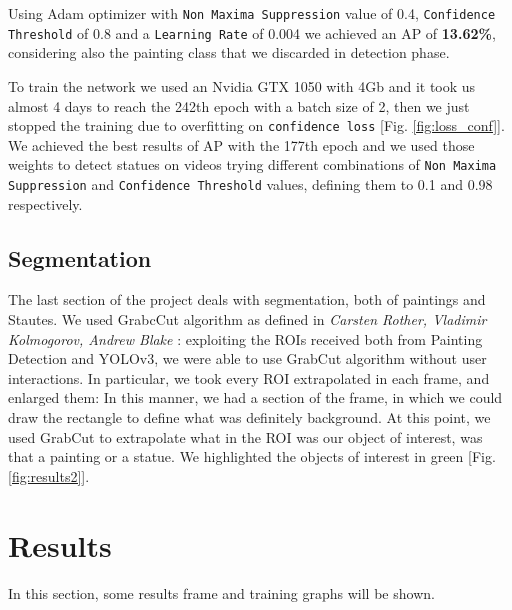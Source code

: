 \documentclass[10pt,twocolumn,letterpaper]{article}
\begin{document}
Using Adam optimizer with {\tt Non Maxima Suppression} value of 0.4, {\tt Confidence Threshold} of 0.8 
and a {\tt Learning Rate} of 0.004 we achieved an AP of {\bf 13.62\%}, considering also the painting class that we 
discarded in detection phase. 

To train the network we used an Nvidia GTX 1050 with 4Gb and it took us almost 4 days to
reach the 242th epoch with a batch size of 2, then we just stopped the training due to overfitting on 
{\tt confidence loss} [Fig. \ref{fig:loss_conf}]. 
We achieved the best results of AP with the 177th epoch and we used those weights to detect
statues on videos trying different combinations of {\tt Non Maxima Suppression} and {\tt Confidence Threshold} values,
defining them to 0.1 and 0.98 respectively.

\subsection{Segmentation}
The last section of the project deals with segmentation, both of paintings and Stautes.
We used GrabcCut algorithm as defined in \textit{Carsten Rother, Vladimir Kolmogorov, Andrew Blake} \cite{grabcut}
: exploiting the ROIs received both from Painting Detection and YOLOv3, we were able to use GrabCut algorithm without user interactions.
In particular, we took every ROI extrapolated in each frame, and enlarged them: In this manner, we had a section of the frame, in which we could draw the rectangle to define what was definitely background.
At this point, we used GrabCut to extrapolate what in the ROI was our object of interest, was that a painting or a statue.
We highlighted the objects of interest in green [Fig. \ref{fig:results2}].

\section{Results}

In this section, some results frame and training graphs will be shown.
\end{document}
